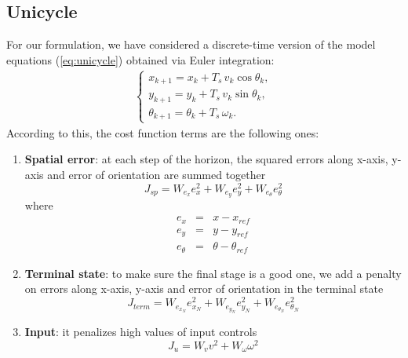 \subsection{Unicycle}
For our formulation, we have considered a discrete-time version of the model equations (\ref{eq:unicycle}) obtained via Euler integration:
\begin{align}
    \label{eq:unicycle_euler}
    \begin{cases}
        x_{k+1} = x_{k} + T_s\, v_{k} \cos \theta_{k}, \\
        y_{k+1} = y_{k} + T_s\, v_{k} \sin \theta_{k}, \\
        \theta_{k+1} = \theta_{k} + T_s\, \omega_{k}.
    \end{cases}
\end{align}
According to this, the cost function terms are the following ones:
\begin{enumerate}
    \item \textbf{Spatial error}: at each step of the horizon, the squared errors along x-axis, y-axis and error of orientation 
                                  are summed together
                                  \begin{equation}
                                      J_{sp} = W_{e_x} e_{x}^2 + W_{e_y} e_{y}^2 + W_{e_{\theta}} e_{\theta}^2
                                  \end{equation}
                                  where 
                                  \begin{subequations}
                                    \begin{eqnarray}
                                        e_x &=& x - x_{ref} \\
                                        e_y &=& y - y_{ref} \\
                                        e_\theta &=& \theta - \theta_{ref}
                                    \end{eqnarray}
                                  \end{subequations}

    \item \textbf{Terminal state}: to make sure the final stage is a good one, we add a penalty on errors along x-axis, y-axis and error of orientation
                                   in the terminal state
                                   \begin{equation}
                                        J_{term} = W_{e_{x_{N}}} e_{x_{N}}^2 + W_{e_{y_{N}}} e_{y_{N}}^2 + W_{e_{{\theta}_{N}}} e_{{\theta}_{N}}^2
                                   \end{equation}

    \item \textbf{Input}: it penalizes high values of input controls 
                                   \begin{equation}
                                        J_{u} = W_{v} v^2 + W_{\omega}  \omega^2
                                   \end{equation}                      
                                \end{enumerate}  

